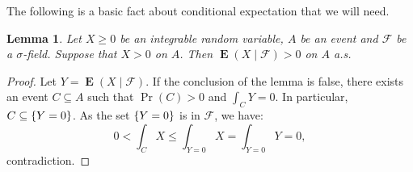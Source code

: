 \documentclass[11pt]{article}
\let\mathcal\mathscr
\let\sub\subseteq
\theoremstyle{plain}
\newtheorem{lemma}[theorem]{Lemma}
\theoremstyle{definition}
\newcommand{\cF}{\mathcal{F}}
\DeclareMathOperator{\E}{\mathbf{E}}
\DeclarePairedDelimiter\set{\{}{\}}
\begin{document}
The following is a basic fact about conditional expectation that we will need.
\begin{lemma}
\label{l:strictly-positive}
Let $X \geq 0$ be an integrable random variable, $A$ be an event and $\cF$ be a $\sigma$-field. Suppose that $X > 0$ on $A$. Then $\E(X \mid \cF) > 0$ on $A$ a.s.
\end{lemma}
\begin{proof}
Let $Y = \E(X \mid \cF)$. If the conclusion of the lemma is false, there exists an event $C \sub A$ such that $\Pr(C) > 0$ and $\int_C Y = 0$. In particular, $C \sub \set{Y = 0}$. As the set $\set{Y = 0}$ is in $\cF$, we have:
\begin{equation*}
0 < \int_C X \leq \int_{Y = 0} X = \int_{Y = 0} Y = 0,
\end{equation*}
contradiction.
\end{proof}
\end{document}
